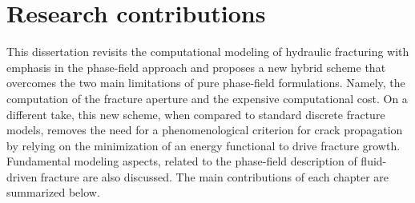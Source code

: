 \section{Research contributions}

This dissertation revisits the computational modeling of hydraulic fracturing with emphasis in the phase-field approach and proposes a new hybrid scheme that overcomes the two main limitations of pure phase-field formulations. Namely, the computation of the fracture aperture and the expensive computational cost. On a different take, this new scheme, when compared to standard discrete fracture models, removes the need for a phenomenological criterion for crack propagation by relying on the minimization of an energy functional to drive fracture growth.
Fundamental modeling aspects, related to the phase-field description of fluid-driven fracture are also discussed. The main contributions of each chapter are summarized below.

